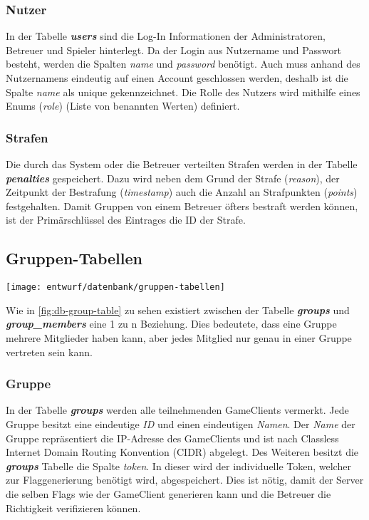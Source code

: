 \subsubsection{Nutzer}
In der Tabelle \textbf{\textit{users}} sind die Log-In Informationen der Administratoren, Betreuer und Spieler hinterlegt. Da der Login aus Nutzername und Passwort besteht, werden die Spalten \textit{name} und \textit{password} benötigt. Auch muss anhand des Nutzernamens eindeutig auf einen Account geschlossen werden, deshalb ist die Spalte \textit{name} als unique gekennzeichnet. Die Rolle des Nutzers wird mithilfe eines Enums (\textit{role}) (Liste von benannten Werten) definiert.

\subsubsection{Strafen}
Die durch das System oder die Betreuer verteilten Strafen werden in der Tabelle \textbf{\textit{penalties}} gespeichert. Dazu wird neben dem Grund der Strafe (\textit{reason}), der Zeitpunkt der Bestrafung (\textit{timestamp}) auch die Anzahl an Strafpunkten (\textit{points}) festgehalten. Damit Gruppen von einem Betreuer öfters bestraft werden können, ist der Primärschlüssel des Eintrages die ID der Strafe.

\subsection{Gruppen-Tabellen}
\begin{center}
	\texttt{[image: entwurf/datenbank/gruppen-tabellen]}
	\label{fig:db-group-table}
\end{center}

Wie in \autoref{fig:db-group-table} zu sehen existiert zwischen der Tabelle \textbf{\textit{groups}} und \textbf{\textit{group\_members}} eine 1 zu n Beziehung. Dies bedeutete, dass eine Gruppe mehrere Mitglieder haben kann, aber jedes Mitglied nur genau in einer Gruppe vertreten sein kann.

\subsubsection{Gruppe}
In der Tabelle \textbf{\textit{groups}} werden alle teilnehmenden GameClients vermerkt. Jede Gruppe besitzt eine eindeutige \textit{ID} und einen eindeutigen \textit{Namen}. Der \textit{Name} der Gruppe repräsentiert die IP-Adresse des GameClients und ist nach Classless Internet Domain Routing Konvention (CIDR) abgelegt. Des Weiteren besitzt die \textbf{\textit{groups}} Tabelle die Spalte \textit{token}. In dieser wird der individuelle Token, welcher zur Flaggenerierung benötigt wird, abgespeichert. Dies ist nötig, damit der Server die selben Flags wie der GameClient generieren kann und die Betreuer die Richtigkeit verifizieren können.

